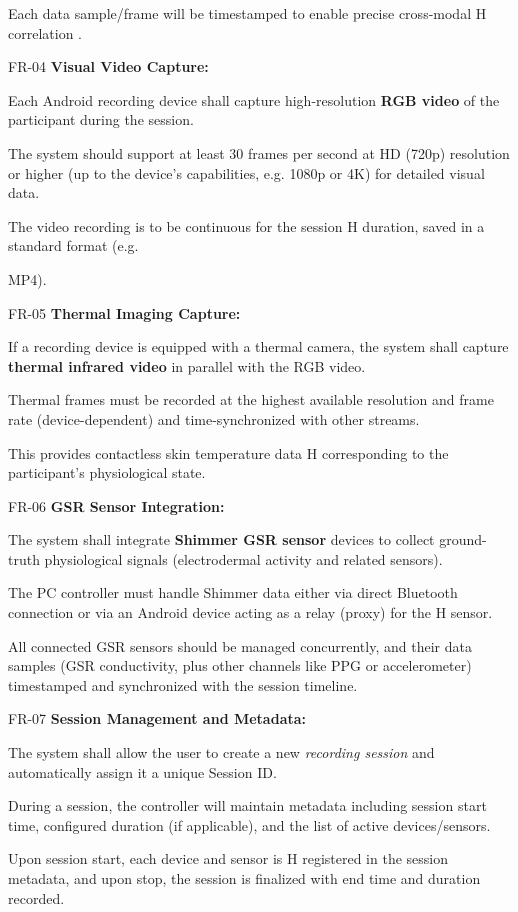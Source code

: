 Each data sample/frame will be timestamped to enable precise cross-modal H correlation .

FR-04 \textbf{Visual Video Capture:}

Each Android recording device shall capture high-resolution \textbf{RGB video}
 of the participant during the session.

The system should support at least 30 frames per second at HD (720p) resolution or higher (up to the device's capabilities, e.g. 1080p or 4K) for detailed visual data.

The video recording is to be continuous for the session H duration, saved in a standard format (e.g.

MP4).

FR-05 \textbf{Thermal Imaging Capture:}

If a recording device is equipped with a thermal camera, the system shall capture \textbf{thermal infrared video}
 in parallel with the RGB video.

Thermal frames must be recorded at the highest available resolution and frame rate (device-dependent) and time-synchronized with other streams.

This provides contactless skin temperature data H corresponding to the participant's physiological state.

FR-06 \textbf{GSR Sensor Integration:}

The system shall integrate \textbf{Shimmer GSR sensor}
 devices to collect ground-truth physiological signals (electrodermal activity and related sensors).

The PC controller must handle Shimmer data either via direct Bluetooth connection or via an Android device acting as a relay (proxy) for the H sensor.

All connected GSR sensors should be managed concurrently, and their data samples (GSR conductivity, plus other channels like PPG or accelerometer) timestamped and synchronized with the session timeline.

FR-07 \textbf{Session Management and Metadata:}

The system shall allow the user to create a new \textit{recording session} and automatically assign it a unique Session ID.

During a session, the controller will maintain metadata including session start time, configured duration (if applicable), and the list of active devices/sensors.

Upon session start, each device and sensor is H registered in the session metadata, and upon stop, the session is finalized with end time and duration recorded.

